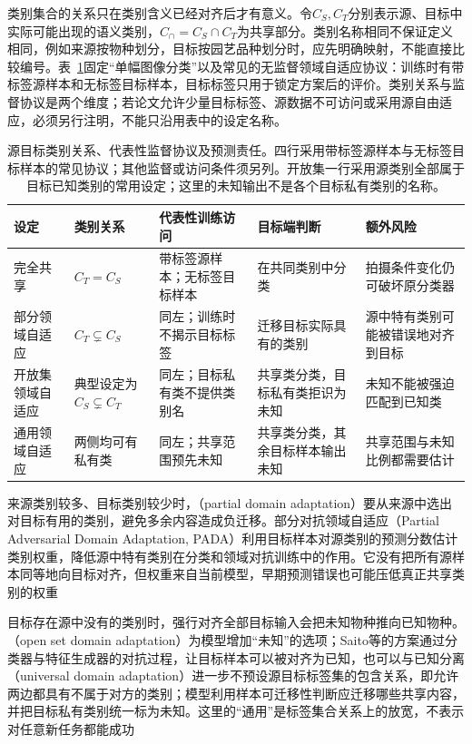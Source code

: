 类别集合的关系只在类别含义已经对齐后才有意义。令$C_S,C_T$分别表示源、目标中实际可能出现的语义类别，$C_{\cap}=C_S\cap C_T$为共享部分。类别名称相同不保证定义相同，例如来源按物种划分，目标按园艺品种划分时，应先明确映射，不能直接比较编号。表~\ref{tab:ket-transfer-class-relations}固定“单幅图像分类”以及常见的无监督领域自适应协议：训练时有带标签源样本和无标签目标样本，目标标签只用于锁定方案后的评价。类别关系与监督协议是两个维度；若论文允许少量目标标签、源数据不可访问或采用源自由适应，必须另行注明，不能只沿用表中的设定名称。

\begin{table}[htbp]
  \centering
  \small
  \setlength{\tabcolsep}{3pt}
  \begin{tabularx}{\linewidth}{p{19mm}p{25mm}p{29mm}XX}
    \toprule
    设定 & 类别关系 & 代表性训练访问 & 目标端判断 & 额外风险 \\
    \midrule
    完全共享 & $C_T=C_S$ & 带标签源样本；无标签目标样本 & 在共同类别中分类 & 拍摄条件变化仍可破坏原分类器 \\
    部分领域自适应 & $C_T\subsetneq C_S$ & 同左；训练时不揭示目标标签 & 迁移目标实际具有的类别 & 源中特有类别可能被错误地对齐到目标 \\
    开放集领域自适应 & 典型设定为$C_S\subsetneq C_T$ & 同左；目标私有类不提供类别名 & 共享类分类，目标私有类拒识为未知 & 未知不能被强迫匹配到已知类 \\
    通用领域自适应 & 两侧均可有私有类 & 同左；共享范围预先未知 & 共享类分类，其余目标样本输出未知 & 共享范围与未知比例都需要估计 \\
    \bottomrule
  \end{tabularx}
  \caption{源目标类别关系、代表性监督协议及预测责任。四行采用带标签源样本与无标签目标样本的常见协议；其他监督或访问条件须另列。开放集一行采用源类别全部属于目标已知类别的常用设定；这里的未知输出不是各个目标私有类别的名称。}
  \label{tab:ket-transfer-class-relations}
\end{table}

来源类别较多、目标类别较少时，（partial domain adaptation）要从来源中选出对目标有用的类别，避免多余内容造成负迁移。部分对抗领域自适应（Partial Adversarial Domain Adaptation, PADA）利用目标样本对源类别的预测分数估计类别权重，降低源中特有类别在分类和领域对抗训练中的作用。它没有把所有源样本同等地向目标对齐，但权重来自当前模型，早期预测错误也可能压低真正共享类别的权重

目标存在源中没有的类别时，强行对齐全部目标输入会把未知物种推向已知物种。（open set domain adaptation）为模型增加“未知”的选项；Saito等的方案通过分类器与特征生成器的对抗过程，让目标样本可以被对齐为已知，也可以与已知分离（universal domain adaptation）进一步不预设源目标标签集的包含关系，即允许两边都具有不属于对方的类别；模型利用样本可迁移性判断应迁移哪些共享内容，并把目标私有类别统一标为未知。这里的“通用”是标签集合关系上的放宽，不表示对任意新任务都能成功

